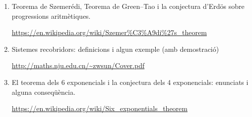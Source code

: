\begin{enumerate}
\item Teorema de Szemerédi, Teorema de Green--Tao i la conjectura d'Erdös sobre progressions aritmètiques.

{\tiny \url{https://en.wikipedia.org/wiki/Szemer%C3%A9di%27s_theorem}}

\item Sistemes recobridors: definicions i algun exemple (amb demostració)

{\tiny \url{http://maths.nju.edu.cn/~zwsun/Cover.pdf}}

\item El teorema dels 6 exponencials i la conjectura dels 4 exponencials: enunciats i alguna conseqüència.

{\tiny \url{https://en.wikipedia.org/wiki/Six_exponentials_theorem}}

\end{enumerate}